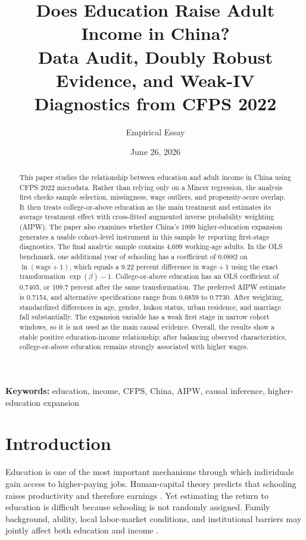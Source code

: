 \documentclass[12pt]{article}
\title{Does Education Raise Adult Income in China?\\Data Audit, Doubly Robust Evidence, and Weak-IV Diagnostics from CFPS 2022}
\author{Empirical Essay}
\date{June 26, 2026}
\begin{document}
\maketitle

\begin{abstract}
This paper studies the relationship between education and adult income in China using CFPS 2022 microdata. Rather than relying only on a Mincer regression, the analysis first checks sample selection, missingness, wage outliers, and propensity-score overlap. It then treats college-or-above education as the main treatment and estimates its average treatment effect with cross-fitted augmented inverse probability weighting (AIPW). The paper also examines whether China's 1999 higher-education expansion generates a usable cohort-level instrument in this sample by reporting first-stage diagnostics. The final analytic sample contains 4,699 working-age adults. In the OLS benchmark, one additional year of schooling has a coefficient of 0.0882 on $\ln(\mathrm{wage}+1)$, which equals a 9.22 percent difference in $\mathrm{wage}+1$ using the exact transformation $\exp(\beta)-1$. College-or-above education has an OLS coefficient of 0.7405, or 109.7 percent after the same transformation. The preferred AIPW estimate is 0.7154, and alternative specifications range from 0.6859 to 0.7730. After weighting, standardized differences in age, gender, hukou status, urban residence, and marriage fall substantially. The expansion variable has a weak first stage in narrow cohort windows, so it is not used as the main causal evidence. Overall, the results show a stable positive education-income relationship; after balancing observed characteristics, college-or-above education remains strongly associated with higher wages.
\end{abstract}

\noindent\textbf{Keywords:} education, income, CFPS, China, AIPW, causal inference, higher-education expansion

\section{Introduction}

Education is one of the most important mechanisms through which individuals gain access to higher-paying jobs. Human-capital theory predicts that schooling raises productivity and therefore earnings \citep{becker1964human, mincer1974schooling}. Yet estimating the return to education is difficult because schooling is not randomly assigned. Family background, ability, local labor-market conditions, and institutional barriers may jointly affect both education and income \citep{card1999causal, heckman2008earnings}.
\end{document}
